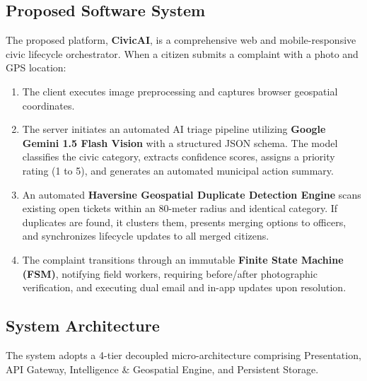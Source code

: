 \documentclass[11pt,a4paper]{article}
\begin{document}
\subsection{Proposed Software System}
The proposed platform, \textbf{CivicAI}, is a comprehensive web and mobile-responsive civic lifecycle orchestrator. When a citizen submits a complaint with a photo and GPS location:
\begin{enumerate}[leftmargin=1.5em]
    \item The client executes image preprocessing and captures browser geospatial coordinates.
    \item The server initiates an automated AI triage pipeline utilizing \textbf{Google Gemini 1.5 Flash Vision} with a structured JSON schema. The model classifies the civic category, extracts confidence scores, assigns a priority rating (1 to 5), and generates an automated municipal action summary.
    \item An automated \textbf{Haversine Geospatial Duplicate Detection Engine} scans existing open tickets within an 80-meter radius and identical category. If duplicates are found, it clusters them, presents merging options to officers, and synchronizes lifecycle updates to all merged citizens.
    \item The complaint transitions through an immutable \textbf{Finite State Machine (FSM)}, notifying field workers, requiring before/after photographic verification, and executing dual email and in-app updates upon resolution.
\end{enumerate}

\subsection{System Architecture}
The system adopts a 4-tier decoupled micro-architecture comprising Presentation, API Gateway, Intelligence \& Geospatial Engine, and Persistent Storage.
\end{document}
